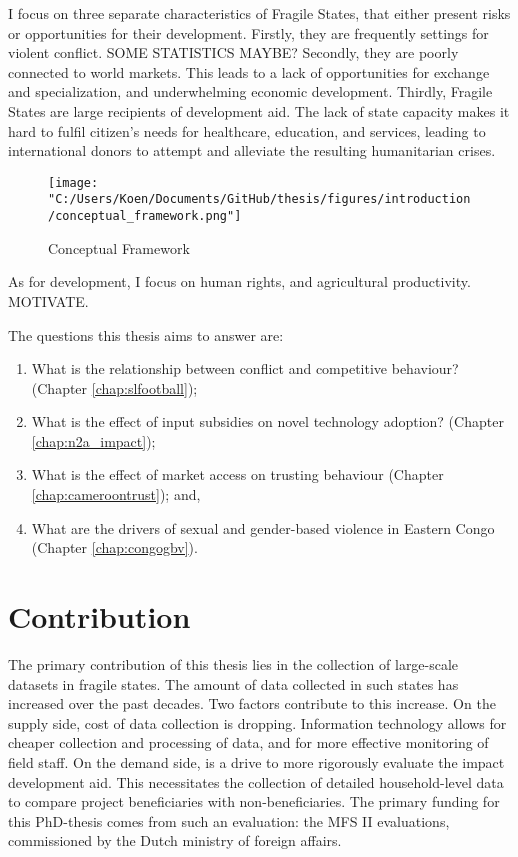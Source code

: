 I focus on three separate characteristics of Fragile States, that either present risks or opportunities for their development. Firstly, they are frequently settings for violent conflict. SOME STATISTICS MAYBE? Secondly, they are poorly connected to world markets. This leads to a lack of opportunities for exchange and specialization, and underwhelming economic development. Thirdly, Fragile States are large recipients of development aid. The lack of state capacity makes it hard to fulfil citizen's needs for healthcare, education, and services, leading to international donors to attempt and alleviate the resulting humanitarian crises.

\begin{figure}[htb]
  \centering
  \texttt{[image: "C:/Users/Koen/Documents/GitHub/thesis/figures/introduction/conceptual\_framework.png"]}
  \caption{Conceptual Framework}
  \label{fig:intro_framework}
\end{figure}


 

As for development, I focus on human rights, and agricultural productivity. MOTIVATE.

The questions this thesis aims to answer are:
\begin{enumerate}
	\item What is the relationship between conflict and competitive behaviour? (Chapter \ref{chap:slfootball});
	\item What is the effect of input subsidies on novel technology adoption? (Chapter \ref{chap:n2a_impact});
	\item What is the effect of market access on trusting behaviour (Chapter \ref{chap:cameroontrust}); and,
	\item What are the drivers of sexual and gender-based violence in Eastern Congo (Chapter \ref{chap:congogbv}).
\end{enumerate}

\section{Contribution}
The primary contribution of this thesis lies in the collection of large-scale datasets in fragile states. The amount of data collected in such states has increased over the past decades. Two factors contribute to this increase. On the supply side, cost of data collection is dropping. Information technology allows for cheaper collection and processing of data, and for more effective monitoring of field staff. On the demand side, is a drive to more rigorously evaluate the impact development aid. This necessitates the collection of detailed household-level data to compare project beneficiaries with non-beneficiaries. The primary funding for this PhD-thesis comes from such an evaluation: the MFS II evaluations, commissioned by the Dutch ministry of foreign affairs.

